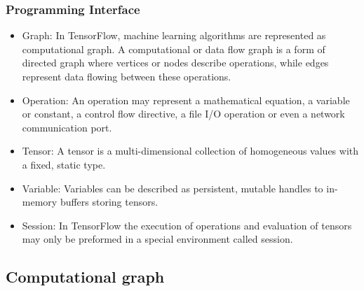 \begin{frame}
  \MyLogo
  \frametitle{Programming Interface}
  \begin{itemize}
	  	\item Graph: In TensorFlow, machine learning algorithms are represented as computational graph. A computational or data flow graph is a form of directed graph where vertices or nodes describe operations, while edges represent data flowing between these operations.
	  	
	  	\item Operation: An operation may represent a mathematical equation, a variable or constant, a control flow directive, a file I/O operation or even a network communication port.
	  	
	  	\item Tensor: A tensor is a multi-dimensional collection of homogeneous values with a fixed, static type.
	  	
	  	\item Variable: Variables can be described as persistent, mutable handles to in-memory buffers storing tensors.
	  	
	  	\item Session: In TensorFlow the execution of operations and evaluation of tensors may only be preformed in a special environment called session.
  \end{itemize}

\end{frame}

\subsection{Computational graph}

